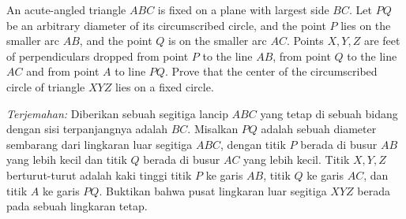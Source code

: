 An acute-angled triangle $ABC$ is fixed on a plane with largest side $BC$. Let $PQ$ be an arbitrary diameter of its circumscribed circle, and the point $P$ lies on the smaller arc $AB$, and the point $Q$ is on the smaller arc $AC$. Points $X, Y, Z$ are feet of perpendiculars dropped from point $P$ to the line $AB$, from point $Q$ to the line $AC$ and from point $A$ to line $PQ$. Prove that the center of the circumscribed circle of triangle $XYZ$ lies on a fixed circle.

\textit{Terjemahan: } Diberikan sebuah segitiga lancip $ABC$ yang tetap di sebuah bidang dengan sisi terpanjangnya adalah $BC$. Misalkan $PQ$ adalah sebuah diameter sembarang dari lingkaran luar segitiga $ABC$, dengan titik $P$ berada di busur $AB$ yang lebih kecil  dan titik $Q$ berada di busur $AC$ yang lebih kecil. Titik $X,Y,Z$ berturut-turut adalah kaki tinggi titik $P$ ke garis $AB$, titik $Q$ ke garis $AC$, dan titik $A$ ke garis $PQ$. Buktikan bahwa pusat lingkaran luar segitiga $XYZ$ berada pada sebuah lingkaran tetap.